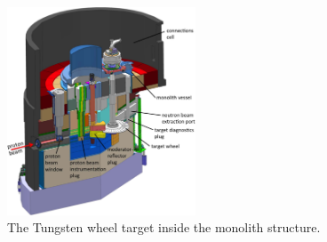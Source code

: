 \begin{figure}[!ht]
	\begin{center}
		\includegraphics[width=0.5\textwidth]{02_BeamDiag/figures/fig000_ESS_target_b}
	\end{center}
	\caption[The Tungsten wheel target inside the monolith structure]{The Tungsten wheel target inside the monolith structure.}
	\label{chap2:fig:target}
\end{figure}
